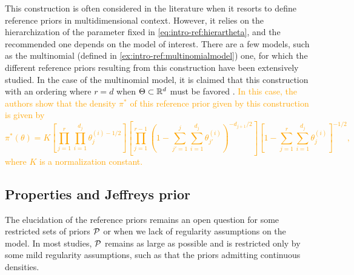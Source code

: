 This construction is often considered in the literature when it resorts to define reference priors in multidimensional context. 
However, it relies on the hierarchization of the parameter fixed in \cref{eq:intro-ref:hierartheta}, and the recommended  one depends on the model of interest.
There are a few models, such as the multinomial (defined in \cref{ex:intro-ref:multinomialmodel}) one, for which the different reference priors resulting from this construction have been extensively studied. In the case of the multinomial model, it is claimed that this construction with an ordering where $r=d$ when $\Theta\subset\mathbb{R}^d$ must be favored  \citep{berger_ordered_1992,berger_overall_2015}.
\textcolor{orange}{In this case, the authors show that the density $\pi^\ast$ of this reference prior given by this construction is given by
    \begin{equation}\label{eq:intro-ref:multinomialhierarref}
        \pi^\ast(\theta) = K \left[\prod_{j=1}^r\prod_{i=1}^{d_j}\theta_j^{(i)-1/2} \right] \left[\prod_{j=1}^{r-1} \left(1- \sum_{j'=1}^j\sum_{i=1}^{d_j}\theta_{j'}^{(i)}   \right)^{-d_{j+1}/2}  \right] \left[1- \sum_{j=1}^r\sum_{i=1}^{d_j}\theta_j^{(i)} \right]^{-1/2},
    \end{equation}
where $K$ is a normalization constant.}





\subsection{Properties and Jeffreys prior}\label{sec:intro-ref:properties}







The elucidation of the reference priors remains an open question for some restricted sets of priors $\mathcal{P}$ or when we lack of regularity assumptions on the model.
In most studies, $\mathcal{P}$ remains as large as possible and is restricted only by some mild regularity assumptions, such as that the priors admitting continuous densities.
    
